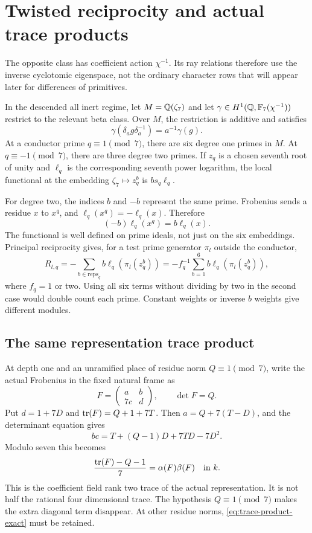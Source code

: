\section{Twisted reciprocity and actual trace products}\label{sec:reciprocity}
The opposite class has coefficient action $\chi^{-1}$. Its ray relations therefore use the inverse cyclotomic eigenspace, not the ordinary character rows that will appear later for differences of primitives.

In the descended all inert regime, let $M=\mathbb Q(\zeta_7)$ and let $\gamma\in H^1(\mathbb Q,\mathbb F_7(\chi^{-1}))$ restrict to the relevant beta class. Over $M$, the restriction is additive and satisfies
\[
\gamma(\delta_a g\delta_a^{-1})=a^{-1}\gamma(g).
\]
At a conductor prime $q\equiv1\pmod7$, there are six degree one primes in $M$. At $q\equiv-1\pmod7$, there are three degree two primes. If $z_q$ is a chosen seventh root of unity and $\ell_q$ is the corresponding seventh power logarithm, the local functional at the embedding $\zeta_7\mapsto z_q^b$ is $b s_q\ell_q$.

For degree two, the indices $b$ and $-b$ represent the same prime. Frobenius sends a residue $x$ to $x^q$, and $\ell_q(x^q)=-\ell_q(x)$. Therefore
\[
(-b)\ell_q(x^q)=b\ell_q(x).
\]
The functional is well defined on prime ideals, not just on the six embeddings. Principal reciprocity gives, for a test prime generator $\pi_l$ outside the conductor,
\begin{equation}\label{eq:orbitreciprocity}
R_{l,q}=-\sum_{b\in\mathrm{reps}_q}b\ell_q(\pi_l(z_q^b))
=-f_q^{-1}\sum_{b=1}^6b\ell_q(\pi_l(z_q^b)),
\end{equation}
where $f_q=1$ or two. Using all six terms without dividing by two in the second case would double count each prime. Constant weights or inverse $b$ weights give different modules.

\subsection{The same representation trace product}
At depth one and an unramified place of residue norm $Q\equiv1\pmod7$, write the actual Frobenius in the fixed natural frame as
\[
F=\begin{pmatrix}a&b\\7c&d\end{pmatrix},\qquad\det F=Q.
\]
Put $d=1+7D$ and $\operatorname{tr}(F)=Q+1+7T$. Then $a=Q+7(T-D)$, and the determinant equation gives
\begin{equation}\label{eq:trace-product-exact}
bc=T+(Q-1)D+7TD-7D^2.
\end{equation}
Modulo seven this becomes
\begin{equation}\label{eq:trace-product}
\frac{\operatorname{tr}(F)-Q-1}{7}=\alpha(F)\beta(F)\quad\text{in }k.
\end{equation}
This is the coefficient field rank two trace of the actual representation. It is not half the rational four dimensional trace. The hypothesis $Q\equiv1\pmod7$ makes the extra diagonal term disappear. At other residue norms, \eqref{eq:trace-product-exact} must be retained.

